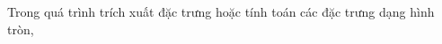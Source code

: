 \documentclass[preview]{standalone}
\begin{document}
\begin{center}
Trong quá trình trích xuất đặc trưng hoặc tính toán các đặc trưng dạng hình tròn,
\end{center}
\end{document}
